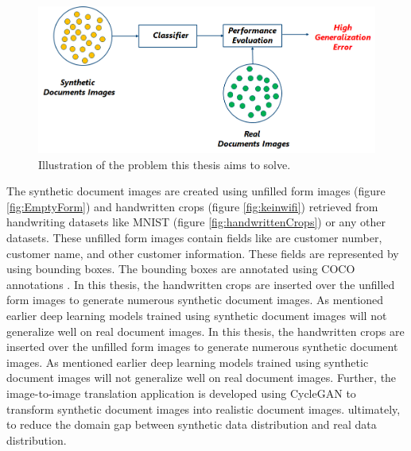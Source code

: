 \begin{figure}[H]
        \begin{center}
	    \includegraphics[scale=0.60]{images/Introduction/Problem.png}
	    \caption[Illustration of the problem this thesis aims to solve.]{Illustration of the problem this thesis aims to solve.}
	    \label{fig:Problem}
	    \end{center}
\end{figure}


The synthetic document images are created using unfilled form images (figure \ref{fig:EmptyForm}) and handwritten crops (figure \ref{fig:keinwifi}) retrieved from handwriting datasets like \ac{MNIST} (figure \ref{fig:handwrittenCrops}) or any other datasets. These unfilled form images contain fields like are customer number, customer name, and other customer information. These fields are represented by using bounding boxes. The bounding boxes are annotated using \ac{COCO} annotations \cite{10.1007/978-3-319-10602-1_48}. In this thesis, the handwritten crops are inserted over the unfilled form images to generate numerous synthetic document images. As mentioned earlier deep learning models trained using synthetic document images will not generalize well on real document images. In this thesis, the handwritten crops are inserted over the unfilled form images to generate numerous synthetic document images. As mentioned earlier deep learning models trained using synthetic document images will not generalize well on real document images. Further, the image-to-image translation application is developed using \ac{CycleGAN} to transform synthetic document images into realistic document images. ultimately, to reduce the domain gap between synthetic data distribution and real data distribution. 


